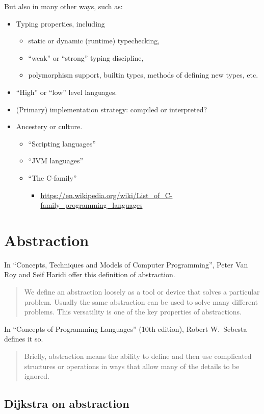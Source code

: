 \documentclass[11pt]{article}
\theoremstyle{definition}
\begin{document}
But also in many other ways, such as:
\begin{itemize}
\item Typing properties, including
\begin{itemize}
\item static or dynamic (runtime) typechecking,
\item “weak” or “strong” typing discipline,
\item polymorphism support, builtin types, methods of defining new types, etc.
\end{itemize}
\item “High” or “low” level languages.
\item (Primary) implementation strategy: compiled or interpreted?
\item Ancestery or culture.
\begin{itemize}
\item “Scripting languages”
\item “JVM languages”
\item “The C-family”
\begin{itemize}
\item \url{https://en.wikipedia.org/wiki/List\_of\_C-family\_programming\_languages}
\end{itemize}
\end{itemize}
\end{itemize}

\section{Abstraction}
\label{sec:orgdec9f17}
In “Concepts, Techniques and Models of Computer Programming”,
Peter Van Roy and Seif Haridi offer this definition of abstraction.
\begin{quote}
We define an
abstraction loosely as a tool or device that solves a particular problem. Usually the
same abstraction can be used to solve many different problems. This versatility
is one of the key properties of abstractions.
\end{quote}

In “Concepts of Programming Languages” (10th edition), Robert W. Sebesta
defines it so.
\begin{quote}
Briefly, abstraction means the ability to define and then use
complicated structures or operations in ways
that allow many of the details to be ignored.
\end{quote}

\subsection{Dijkstra on abstraction}
\label{sec:org5700042}
\end{document}
